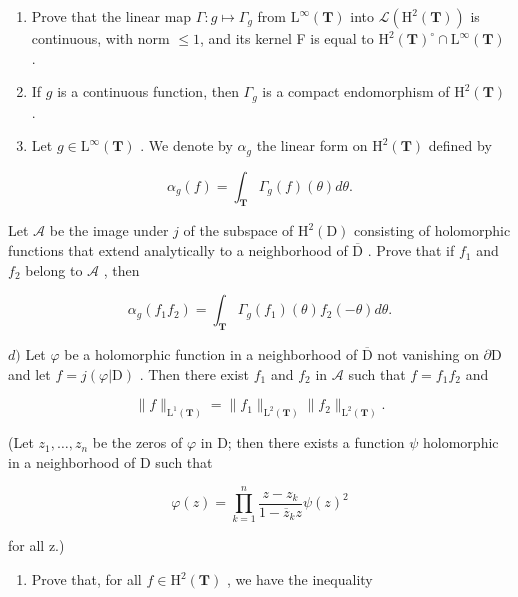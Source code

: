 \begin{enumerate}
\def\labelenumi{\alph{enumi})}
\item
  Prove that the linear map \(\Gamma\colon g\mapsto\Gamma_{g}\) from \(\mathrm{L}^{\infty}(\mathbf{T})\) into \(\mathcal{L}(\mathrm{H}^{2}(\mathbf{T}))\) is continuous, with norm \(\leqslant 1\), and its kernel F is equal to \(\mathrm{H}^{2}(\mathbf{T})^{\circ}\cap\mathrm{L}^{\infty}(\mathbf{T})\) .
\item
  If \(g\) is a continuous function, then \(\Gamma_g\) is a compact endomorphism of \(\mathrm{H}^2 (\mathbf{T})\) .
\item
  Let \(g \in \mathrm{L}^{\infty}(\mathbf{T})\) . We denote by \(\alpha_{g}\) the linear form on \(\mathrm{H}^{2}(\mathbf{T})\) defined by
\end{enumerate}

\[
\alpha_ {g} (f) = \int_ {\mathbf {T}} \Gamma_ {g} (f) (\theta) d \theta .
\]

Let \(\mathcal{A}\) be the image under \(j\) of the subspace of \(\mathrm{H}^2 (\mathrm{D})\) consisting of holomorphic functions that extend analytically to a neighborhood of \(\overline{\mathrm{D}}\) . Prove that if \(f_{1}\) and \(f_{2}\) belong to \(\mathcal{A}\) , then

\[
\alpha_ {g} (f _ {1} f _ {2}) = \int_ {\mathbf {T}} \Gamma_ {g} (f _ {1}) (\theta) f _ {2} (- \theta) d \theta .
\]

\(d)\) Let \(\varphi\) be a holomorphic function in a neighborhood of \(\overline{\mathrm{D}}\) not vanishing on \(\partial\mathrm{D}\) and let \(f = j(\varphi|\mathrm{D})\) . Then there exist \(f_{1}\) and \(f_{2}\) in \(\mathscr{A}\) such that \(f = f_{1}f_{2}\) and

\[
\| f \| _ {\mathrm{L} ^ {1} (\mathbf {T})} = \| f _ {1} \| _ {\mathrm{L} ^ {2} (\mathbf {T})} \| f _ {2} \| _ {\mathrm{L} ^ {2} (\mathbf {T})}.
\]

(Let \(z_{1},\ldots,z_{n}\) be the zeros of \(\varphi\) in D; then there exists a function \(\psi\) holomorphic in a neighborhood of D such that

\[
\varphi (z) = \prod_ {k = 1} ^ {n} \frac {z - z _ {k}}{1 - \overline {{z}} _ {k} z} \psi (z) ^ {2}
\]

for all z.)

\begin{enumerate}
\def\labelenumi{\alph{enumi})}
\setcounter{enumi}{4}
\tightlist
\item
  Prove that, for all \(f \in \mathrm{H}^{2}(\mathbf{T})\) , we have the inequality
\end{enumerate}

